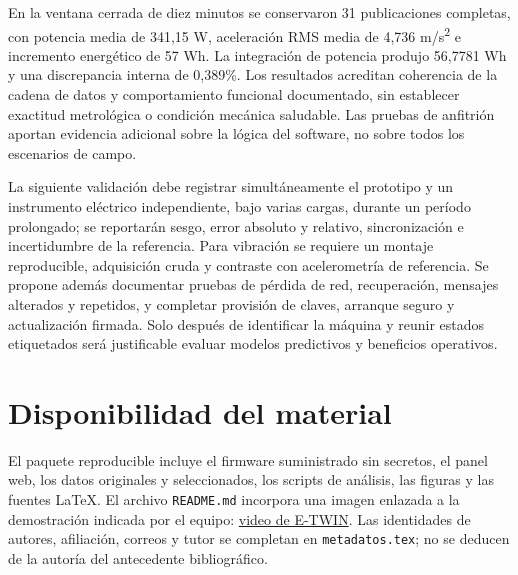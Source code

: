 \documentclass[journal,onecolumn,11pt,a4paper]{IEEEtran}
\begin{document}
En la ventana cerrada de diez minutos se conservaron 31 publicaciones completas, con potencia media de 341,15 W, aceleración RMS media de 4,736 m/s\textsuperscript{2} e incremento energético de 57 Wh. La integración de potencia produjo 56,7781 Wh y una discrepancia interna de 0,389\%. Los resultados acreditan coherencia de la cadena de datos y comportamiento funcional documentado, sin establecer exactitud metrológica o condición mecánica saludable. Las pruebas de anfitrión aportan evidencia adicional sobre la lógica del software, no sobre todos los escenarios de campo.

La siguiente validación debe registrar simultáneamente el prototipo y un instrumento eléctrico independiente, bajo varias cargas, durante un período prolongado; se reportarán sesgo, error absoluto y relativo, sincronización e incertidumbre de la referencia. Para vibración se requiere un montaje reproducible, adquisición cruda y contraste con acelerometría de referencia. Se propone además documentar pruebas de pérdida de red, recuperación, mensajes alterados y repetidos, y completar provisión de claves, arranque seguro y actualización firmada. Solo después de identificar la máquina y reunir estados etiquetados será justificable evaluar modelos predictivos y beneficios operativos.

\section*{Disponibilidad del material}
El paquete reproducible incluye el firmware suministrado sin secretos, el panel web, los datos originales y seleccionados, los scripts de análisis, las figuras y las fuentes LaTeX. El archivo \texttt{README.md} incorpora una imagen enlazada a la demostración indicada por el equipo: \href{https://youtu.be/txEMzoSkKmY}{video de E-TWIN}. Las identidades de autores, afiliación, correos y tutor se completan en \texttt{metadatos.tex}; no se deducen de la autoría del antecedente bibliográfico.



\end{document}
